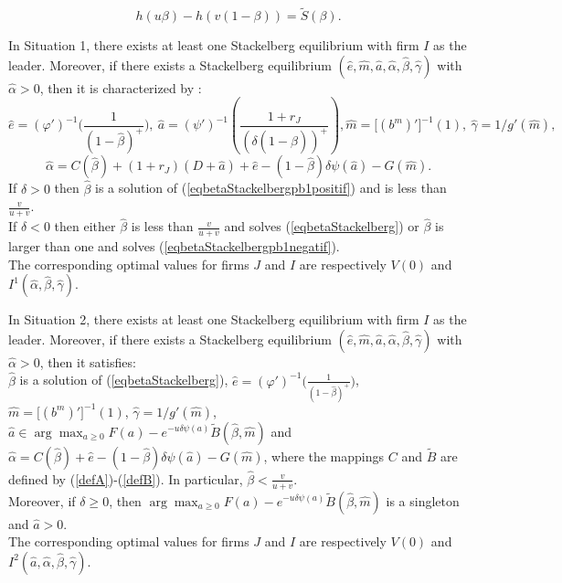 \documentclass{svjour3}
\begin{document}
\begin{equation}
\label{eqbetaStackelbergpb1negatif}
h(u\beta)-h(v(1-\beta))=\widetilde{S} (\beta).
\end{equation}

\begin{theorem}
\label{PropStackelbergpb1}
In Situation 1, there exists at least one Stackelberg equilibrium with firm $I$ as the leader. Moreover, if there exists   a Stackelberg equilibrium 
$(\hat e, \hat m, \hat a, \hat\alpha, \hat\beta,\hat\gamma)$
with $\hat\alpha>0$, then it is characterized by :
 $$\hat e=(\varphi')^{-1}\Big(\frac{1}{(1-\hat\beta)^+}\Big),~
 \hat a=(\psi')^{-1}\left(\frac{1+r_J}{(\delta(1-\hat\beta))^+}\right),
 \hat m=\big[(b^m)'\big]^{-1}(1),~\hat\gamma=1/g'(\hat m),$$
  $$\hat\alpha= C(\hat\beta)+(1+r_J)(D+\hat a)+\hat e-(1-\hat\beta)\delta\psi(\hat a)-G(\hat m).$$
   If $\delta>0$ then 
$\hat \beta$ is a solution of (\ref{eqbetaStackelbergpb1positif}) and is less than $\frac{v}{u+v}$. 
\\
If $\delta<0$ then either $\hat \beta$ is less than $\frac{v}{u+v}$ and solves (\ref{eqbetaStackelberg}) or $\hat \beta$ is larger than one and solves (\ref{eqbetaStackelbergpb1negatif}).\\
The corresponding optimal values for firms $J$ and $I$ are respectively $V(0)$ and $I^1(\hat\alpha,\hat\beta,\hat\gamma)$.
\end{theorem}

\begin{theorem}
\label{PropStackelberg}
In Situation 2,  there exists at least one Stackelberg equilibrium with firm $I$ as the leader.
Moreover, if there exists   a Stackelberg equilibrium 
$(\hat e, \hat m, \hat a, \hat\alpha, \hat\beta,\hat\gamma)$
with $\hat\alpha>0$, then it satisfies:
\\
$\hat\beta$ is a solution of (\ref{eqbetaStackelberg}), $\hat e=(\varphi')^{-1}\Big(\frac{1}{(1-\hat\beta)^+}\Big)$, $\hat m=\big[(b^m)'\big]^{-1}(1)$, $\hat\gamma=1/g'(\hat m)$, 
$\hat a\in\arg\max_{a\geq 0} F(a)-e^{-u\delta\psi(a)}\tilde B(\hat\beta,\hat m)$ and
 $\hat\alpha=C(\hat\beta)+\hat e-(1-\hat\beta)\delta\psi(\hat a)-G(\hat m)$,
 where the mappings $C$ and $\tilde B$ are defined by (\ref{defA})-(\ref{defB}).
In particular, $\hat\beta<\frac{v}{u+v}$. 
\\
Moreover, if $\delta\geq 0$, then $\arg\max_{a\geq 0} F(a)-e^{-u\delta\psi(a)}\tilde B(\hat\beta,\hat m)$ is a singleton and $\hat a>0$.\\
The corresponding optimal values for firms $J$ and $I$ are respectively $V(0)$ and $I^2(\hat a,\hat\alpha,\hat\beta,\hat\gamma)$.\end{theorem}
\end{document}
